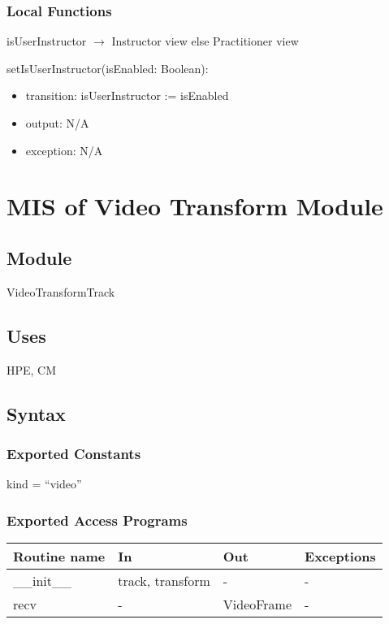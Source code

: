 \documentclass[12pt, titlepage]{article}
\begin{document}
\subsubsection{Local Functions}

\noindent isUserInstructor $\rightarrow$ Instructor view else Practitioner view

\noindent setIsUserInstructor(isEnabled: Boolean):
\begin{itemize}
  \item transition: isUserInstructor := isEnabled
  \item output: N/A
  \item exception: N/A
\end{itemize}

\section{MIS of Video Transform Module} \label{sec:videotransform}

\subsection{Module}
VideoTransformTrack

\subsection{Uses}
HPE, CM

\subsection{Syntax}

\subsubsection{Exported Constants}
kind = ``video''

\subsubsection{Exported Access Programs}
\begin{table}[h!]
  \centering
  \begin{tabular}{llll}
    \hline
    \textbf{Routine name} & \textbf{In}            & \textbf{Out}     & \textbf{Exceptions} \\
    \hline
    \_\_init\_\_    & track, transform & -          & -             \\
    recv            & -                & VideoFrame & -             \\
    \hline
  \end{tabular}
\end{table}
\end{document}
